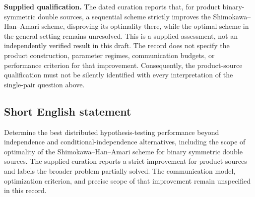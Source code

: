 \documentclass[11pt]{article}
\begin{document}
\textbf{Supplied qualification.} The dated curation reports that, for product binary-symmetric double sources, a sequential scheme strictly improves the Shimokawa--Han--Amari scheme, disproving its optimality there, while the optimal scheme in the general setting remains unresolved. This is a supplied assessment, not an independently verified result in this draft. The record does not specify the product construction, parameter regimes, communication budgets, or performance criterion for that improvement. Consequently, the product-source qualification must not be silently identified with every interpretation of the single-pair question above.
\subsection{Short English statement}
Determine the best distributed hypothesis-testing performance beyond independence and conditional-independence alternatives, including the scope of optimality of the Shimokawa--Han--Amari scheme for binary symmetric double sources. The supplied curation reports a strict improvement for product sources and labels the broader problem partially solved. The communication model, optimization criterion, and precise scope of that improvement remain unspecified in this record.
\end{document}
